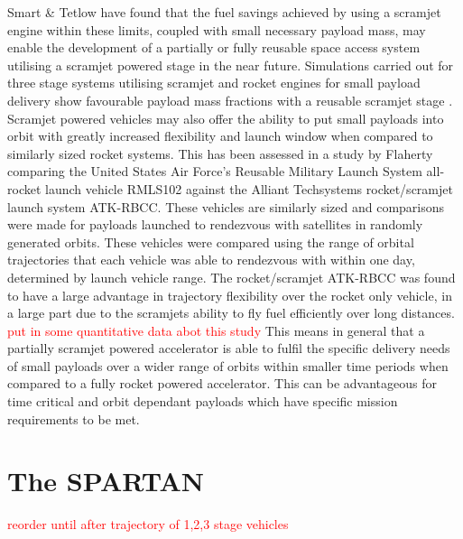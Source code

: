 Smart \& Tetlow \cite{Smart2009} have found that the fuel savings achieved by using a scramjet engine within these limits, coupled with small necessary payload mass, may enable the development of a partially or fully reusable space access system utilising a scramjet powered stage in the near future. Simulations carried out  for three stage systems utilising scramjet and rocket engines for small payload delivery show favourable payload mass fractions with a reusable scramjet stage  \cite{Smart2009}. Scramjet powered vehicles may also offer the ability to put small payloads into orbit with greatly increased flexibility and launch window when compared to similarly sized rocket systems. This has been assessed in a study by Flaherty  \cite{Flaherty2010} comparing the United States Air Force's Reusable Military Launch System all-rocket launch vehicle RMLS102 against the Alliant Techsystems rocket/scramjet launch system ATK-RBCC. These vehicles are similarly sized and comparisons were made for payloads launched to rendezvous with satellites in randomly generated orbits. These vehicles were compared using the range of orbital trajectories that each vehicle was able to rendezvous with within one day, determined by launch vehicle range. The rocket/scramjet ATK-RBCC was found to have a large advantage in trajectory flexibility over the rocket only vehicle, in a large part due to the scramjets ability to fly fuel efficiently over long distances. \textcolor{red}{put in some quantitative data abot this study} This means in general that a partially scramjet powered accelerator  is able to fulfil the specific delivery needs of small payloads over a wider range of orbits within smaller time periods when compared to a fully rocket powered accelerator. This can be advantageous for time critical and orbit dependant payloads which have specific mission requirements to be met. 




\section{The SPARTAN}

\textcolor{red}{reorder until after trajectory of 1,2,3 stage vehicles}




